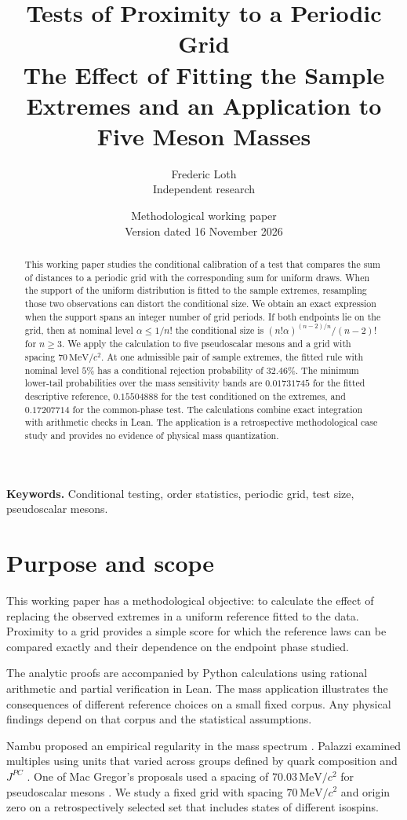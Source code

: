 \documentclass[11pt,a4paper]{article}
\title{Tests of Proximity to a Periodic Grid\\[2pt]
\large The Effect of Fitting the Sample Extremes and an Application to Five Meson Masses}
\author{Frederic Loth\\[4pt]
\small Independent research}
\date{Methodological working paper\\Version dated 16 November 2026}
\newcommand{\unit}{\,\mathrm{MeV}/c^{2}}
\begin{document}
\maketitle
\begin{abstract}
This working paper studies the conditional calibration of a test that compares the sum of distances to a periodic grid with the corresponding sum for uniform draws. When the support of the uniform distribution is fitted to the sample extremes, resampling those two observations can distort the conditional size. We obtain an exact expression when the support spans an integer number of grid periods. If both endpoints lie on the grid, then at nominal level $\alpha\leq 1/n!$ the conditional size is $(n!\alpha)^{(n-2)/n}/(n-2)!$ for $n\geq 3$. We apply the calculation to five pseudoscalar mesons and a grid with spacing $70\unit$. At one admissible pair of sample extremes, the fitted rule with nominal level $5\%$ has a conditional rejection probability of $32.46\%$. The minimum lower-tail probabilities over the mass sensitivity bands are $0.01731745$ for the fitted descriptive reference, $0.15504888$ for the test conditioned on the extremes, and $0.17207714$ for the common-phase test. The calculations combine exact integration with arithmetic checks in Lean. The application is a retrospective methodological case study and provides no evidence of physical mass quantization.
\end{abstract}
\noindent\textbf{Keywords.} Conditional testing, order statistics, periodic grid, test size, pseudoscalar mesons.

\section{Purpose and scope}

This working paper has a methodological objective: to calculate the effect of replacing the observed extremes in a uniform reference fitted to the data. Proximity to a grid provides a simple score for which the reference laws can be compared exactly and their dependence on the endpoint phase studied.

The analytic proofs are accompanied by Python calculations using rational arithmetic and partial verification in Lean. The mass application illustrates the consequences of different reference choices on a small fixed corpus. Any physical findings depend on that corpus and the statistical assumptions.

Nambu proposed an empirical regularity in the mass spectrum \cite{nambu}. Palazzi examined multiples using units that varied across groups defined by quark composition and $J^{PC}$ \cite{palazzi}. One of Mac Gregor's proposals used a spacing of $70.03\unit$ for pseudoscalar mesons \cite{macgregor}. We study a fixed grid with spacing $70\unit$ and origin zero on a retrospectively selected set that includes states of different isospins.
\end{document}
